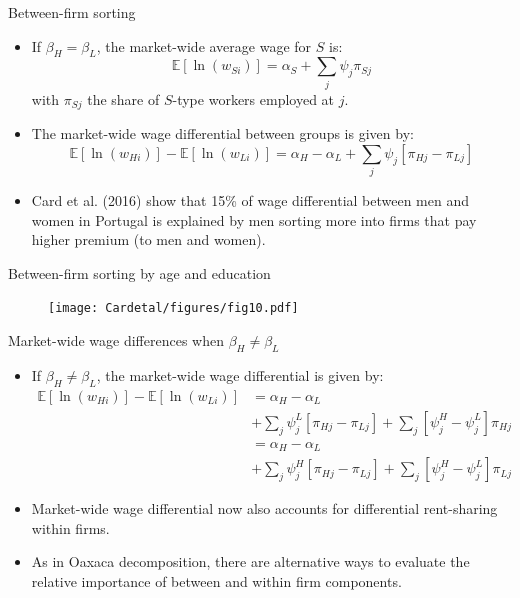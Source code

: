 \documentclass[notes=show]{beamer}
\begin{document}
\begin{frame}{Between-firm sorting}
\begin{itemize}
\item If $\beta_{H}=\beta_{L}$, the market-wide average wage for $S$ is:
\begin{equation*}
    \mathbb{E}[\ln(w_{Si})] = \alpha_{S} + \sum_{j}\psi_{j} \pi_{Sj}
\end{equation*}
with $\pi_{Sj}$ the share of $S$-type workers employed at $j$. \medskip
\item The market-wide wage differential between groups is given by:
\begin{equation*}
    \mathbb{E}[\ln(w_{Hi})] - \mathbb{E}[\ln(w_{Li})] = \alpha_{H} - \alpha_{L} + \sum_{j}\psi_{j} [\pi_{Hj} - \pi_{Lj}] \tag{16}
\end{equation*}
\item Card et al. (2016) show that 15\% of wage differential between men and women in Portugal is explained by men sorting more into firms that pay higher premium (to men and women).
\end{itemize}
\end{frame}

\newpage
\begin{frame}{Between-firm sorting by age and education}
\begin{center}
\begin{figure}
\texttt{[image: Cardetal/figures/fig10.pdf]}
\end{figure} 
\end{center}
\end{frame}

\begin{frame}{Market-wide wage differences when $\beta_{H} \neq \beta_{L}$}
\begin{itemize}
\item If $\beta_{H} \neq \beta_{L}$, the market-wide wage differential is given by:
\begin{align*}
    \mathbb{E}[\ln(w_{Hi})] - \mathbb{E}[\ln(w_{Li})] & = \alpha_{H} - \alpha_{L} \\
    & + \sum_{j}\psi_{j}^{L} [\pi_{Hj} - \pi_{Lj}] + \sum_{j} [\psi_{j}^{H} - \psi_{j}^{L} ]\pi_{Hj}  \\
    &  = \alpha_{H} - \alpha_{L} \\
    & + \sum_{j}\psi_{j}^{H} [\pi_{Hj} - \pi_{Lj}] + \sum_{j} [\psi_{j}^{H} - \psi_{j}^{L} ]\pi_{Lj}
\end{align*}
\item Market-wide wage differential now also accounts for differential rent-sharing within firms. \medskip
\item As in Oaxaca decomposition, there are alternative ways to evaluate the relative importance of between and within firm components.
\end{itemize}
\end{frame}
\end{document}
